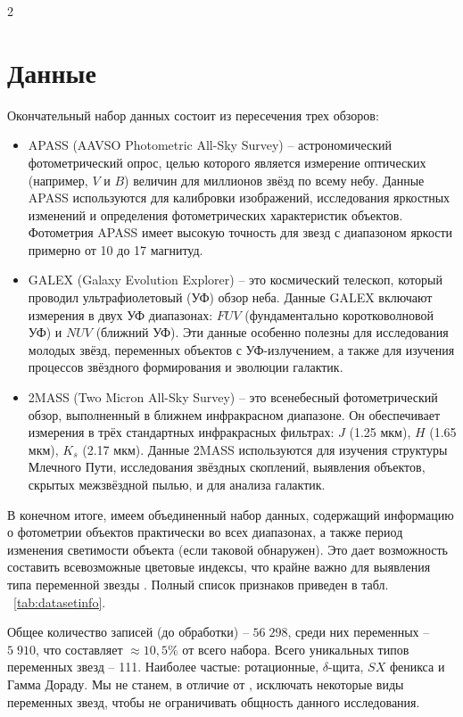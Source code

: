 \documentclass[11pt, a4paper]{article}
\begin{document}
\begin{multicols}{2}
\section{Данные}
Окончательный набор данных состоит из пересечения трех обзоров:
\begin{itemize}
    \item[i)] APASS (AAVSO Photometric All-Sky Survey) -- астрономический фотометрический опрос, целью которого является измерение оптических (например, $V$ и $B$) величин для миллионов звёзд по всему небу. Данные APASS используются для калибровки изображений, исследования яркостных изменений и определения фотометрических характеристик объектов. Фотометрия APASS имеет высокую точность для звезд с диапазоном яркости примерно от 10 до 17 магнитуд.
    \item[ii)] GALEX (Galaxy Evolution Explorer) -- это космический телескоп, который проводил ультрафиолетовый (УФ) обзор неба. Данные GALEX включают измерения в двух УФ диапазонах: $FUV$ (фундаментально коротковолновой УФ) и $NUV$ (ближний УФ). Эти данные особенно полезны для исследования молодых звёзд, переменных объектов с УФ-излучением, а также для изучения процессов звёздного формирования и эволюции галактик.
    \item[iii)] 2MASS (Two Micron All-Sky Survey) -- это всенебесный фотометрический обзор, выполненный в ближнем инфракрасном диапазоне. Он обеспечивает измерения в трёх стандартных инфракрасных фильтрах: $J$ (1.25 мкм), $H$ (1.65 мкм), $K_s$ (2.17 мкм). Данные 2MASS используются для изучения структуры Млечного Пути, исследования звёздных скоплений, выявления объектов, скрытых межзвёздной пылью, и для анализа галактик.
\end{itemize}
В конечном итоге, имеем объединенный набор данных, содержащий информацию о фотометрии объектов практически во всех диапазонах, а также период изменения светимости объекта (если таковой обнаружен). Это дает возможность составить всевозможные цветовые индексы, что крайне важно для выявления типа переменной звезды \autocite{first-article}. Полный список признаков приведен в табл. ~\ref{tab:datasetinfo}.

Общее количество записей (до обработки) -- $56\;298$, среди них переменных -- $5\;910$, что составляет $\approx10,5\%$ от всего набора. Всего уникальных типов переменных звезд -- 111. Наиболее частые: ротационные, $\delta$-щита, $SX$ феникса и Гамма Дораду. Мы не станем, в отличие от \autocite{Hosenie2019}, исключать некоторые виды переменных звезд, чтобы не ограничивать общность данного исследования.


\end{multicols}
\end{document}
